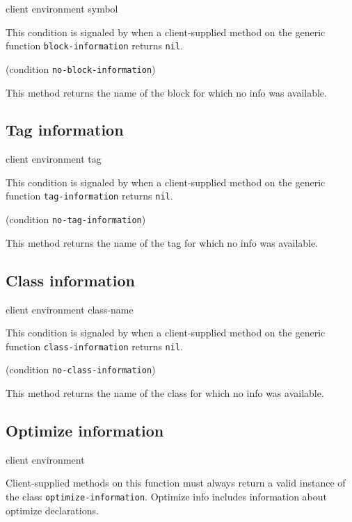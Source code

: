 {client environment symbol}


This condition is signaled by \sysname{} when a client-supplied method
on the generic function \texttt{block-information} returns \texttt{nil}.

 {(condition {\tt no-block-information})}

This method returns the name of the block for which no info was
available.

\subsection{Tag information}

 {client environment tag}


This condition is signaled by \sysname{} when a client-supplied method
on the generic function \texttt{tag-information} returns \texttt{nil}.

 {(condition {\tt no-tag-information})}

This method returns the name of the tag for which no info was
available.

\subsection{Class information}

 {client environment class-name}


This condition is signaled by \sysname{} when a client-supplied method
on the generic function \texttt{class-information} returns \texttt{nil}.

 {(condition {\tt no-class-information})}

This method returns the name of the class for which no info was
available.

\subsection{Optimize information}

 {client environment}

Client-supplied methods on this function must always return a valid
instance of the class \texttt{optimize-information}. Optimize info includes
information about optimize declarations.


